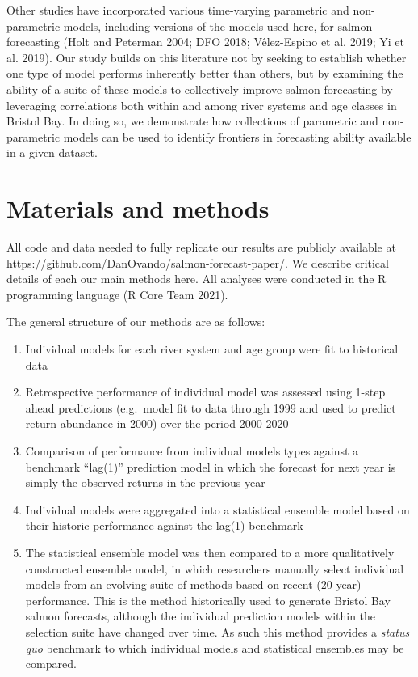 \documentclass[
]{article}
\begin{document}
Other studies have incorporated various time-varying parametric and non-parametric models, including versions of the models used here, for salmon forecasting (Holt and Peterman 2004; DFO 2018; Vêlez-Espino et al. 2019; Yi et al. 2019). Our study builds on this literature not by seeking to establish whether one type of model performs inherently better than others, but by examining the ability of a suite of these models to collectively improve salmon forecasting by leveraging correlations both within and among river systems and age classes in Bristol Bay. In doing so, we demonstrate how collections of parametric and non-parametric models can be used to identify frontiers in forecasting ability available in a given dataset.

\hypertarget{materials-and-methods}{%
\section{Materials and methods}\label{materials-and-methods}}

All code and data needed to fully replicate our results are publicly available at \url{https://github.com/DanOvando/salmon-forecast-paper/}. We describe critical details of each our main methods here. All analyses were conducted in the R programming language (R Core Team 2021).

The general structure of our methods are as follows:

\begin{enumerate}
\def\labelenumi{\arabic{enumi}.}
\item
  Individual models for each river system and age group were fit to historical data
\item
  Retrospective performance of individual model was assessed using 1-step ahead predictions (e.g.~model fit to data through 1999 and used to predict return abundance in 2000) over the period 2000-2020
\item
  Comparison of performance from individual models types against a benchmark ``lag(1)'' prediction model in which the forecast for next year is simply the observed returns in the previous year
\item
  Individual models were aggregated into a statistical ensemble model based on their historic performance against the lag(1) benchmark
\item
  The statistical ensemble model was then compared to a more qualitatively constructed ensemble model, in which researchers manually select individual models from an evolving suite of methods based on recent (20-year) performance. This is the method historically used to generate Bristol Bay salmon forecasts, although the individual prediction models within the selection suite have changed over time. As such this method provides a \emph{status quo} benchmark to which individual models and statistical ensembles may be compared.
\end{enumerate}
\end{document}
